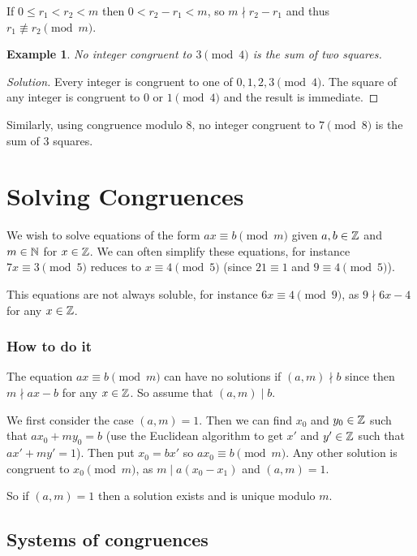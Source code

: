 \documentclass{notes}
\theoremstyle{plain}
\newtheorem*{example}{Example}
\newcommand{\nequiv}{\not\equiv}
\begin{document}
If $0 \le r_1 < r_2 < m$ then $0 < r_2 - r_1 < m$, so $m \nmid r_2 - r_1$
and thus $r_1 \nequiv r_2 \pmod{m}$. 

\begin{example}
No integer congruent to $3 \pmod{4}$ is the sum of two squares.
\end{example}

\begin{proof}[Solution]
Every integer is congruent to one of $0,1,2,3 \pmod{4}$.  The square of
any integer is congruent to $0$ or $1 \pmod{4}$ and the result is immediate.
\end{proof}

Similarly, using congruence modulo 8, no integer congruent to $7 \pmod{8}$
is the sum of 3 squares.

\section{Solving Congruences}

We wish to solve equations of the form $a x \equiv b \pmod{m}$ given
$a,b \in \mathbb{Z}$ and $m \in \mathbb{N}$ for $x \in \mathbb{Z}$.  We can often simplify
these equations, for instance $7 x \equiv 3 \pmod{5}$ reduces to
$x \equiv 4 \pmod{5}$ (since $21 \equiv 1$ and $9 \equiv 4 \pmod{5}$).

This equations are not always soluble, for instance $6 x \equiv 4
\pmod{9}$, as $9 \nmid 6 x - 4$ for any $x \in \mathbb{Z}$.

\subsubsection*{How to do it}

The equation $a x \equiv b \pmod{m}$ can have no solutions if $(a,m)
\nmid b$ since then $m \nmid a x - b$ for any $x \in \mathbb{Z}$.  So assume
that $(a,m) \mid b$.

We first consider the case $(a,m) = 1$.  Then we can find $x_0$ and
$y_0 \in \mathbb{Z}$ such that $a x_0 + m y_0 = b$
(use the Euclidean algorithm to get $x'$ and $y' \in \mathbb{Z}$ such that
$a x' + m y' = 1$).  Then put $x_0 = b x'$ so $a x_0 \equiv b
\pmod{m}$.  Any other solution is congruent to $x_0 \pmod{m}$, as
$m \mid a(x_0 - x_1)$ and $(a,m) = 1$.

So if $(a,m) = 1$ then a solution exists and is unique modulo $m$.

\subsection{Systems of congruences}
\end{document}

